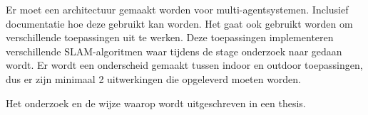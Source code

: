 Er moet een architectuur gemaakt worden voor multi-agentsystemen. Inclusief documentatie hoe deze gebruikt kan worden. Het gaat ook gebruikt worden om verschillende toepassingen uit te werken. Deze toepassingen implementeren verschillende SLAM-algoritmen waar tijdens de stage onderzoek naar gedaan wordt. Er wordt een onderscheid gemaakt tussen indoor en outdoor toepassingen, dus er zijn minimaal 2 uitwerkingen die opgeleverd moeten worden.

Het onderzoek en de wijze waarop wordt uitgeschreven in een thesis.